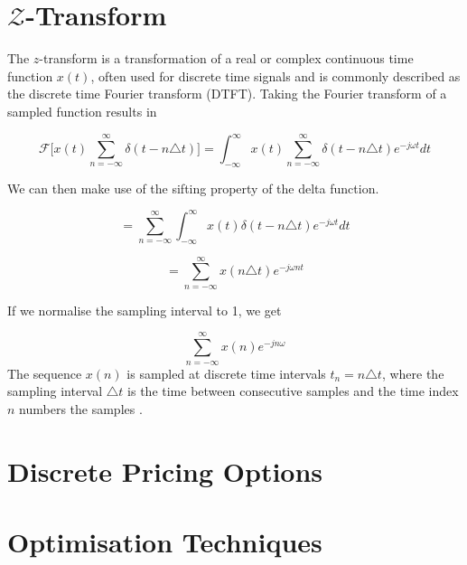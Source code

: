\documentclass[a4paper]{report}
\begin{document}
\section{$\mathcal{Z}$-Transform}

The $z$-transform is a transformation of a real or complex continuous time function $x(t)$, often used for discrete time signals and is commonly described as the discrete time Fourier transform (DTFT). Taking the Fourier transform of a sampled function results in

\begin{equation}
\mathcal{F}\bigg[x(t) \sum^{\infty}_{n = -\infty} \delta(t - n \triangle t)\bigg] = \int^{\infty}_{-\infty} x(t)	 \sum_{n = - \infty}^{\infty} \delta (t - n\triangle t)e^{-j\omega t} dt 
\end{equation}

\noindent We can then make use of the sifting property of the delta function.

\begin{equation}
	= \sum_{n = - \infty}^{\infty} \int^{\infty}_{-\infty} x(t) \delta (t - n\triangle t)e^{-j\omega t} dt 
\end{equation}

\begin{equation}
	= \sum^{\infty}_{n=-\infty} x(n \triangle t)e^{-j\omega nt}
\end{equation}

\noindent If we normalise the sampling interval to 1, we get

\begin{equation}
	\sum^{\infty}_{n = - \infty} x(n)e^{-j n \omega}
\end{equation}
The sequence $x(n)$ is sampled at discrete time intervals $t_n = n \triangle t$, where the sampling interval $\triangle t$ is the time between consecutive samples and the time index $n$ numbers the samples \cite{LovelessGuido2021}. 

\section{Discrete Pricing Options}

\section{Optimisation Techniques}

\end{document}
